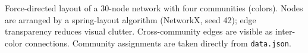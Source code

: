 \caption{Force-directed layout of a 30-node network with four communities (colors). Nodes are arranged by a spring-layout algorithm (NetworkX, seed 42); edge transparency reduces visual clutter. Cross-community edges are visible as inter-color connections. Community assignments are taken directly from \texttt{data.json}.}
